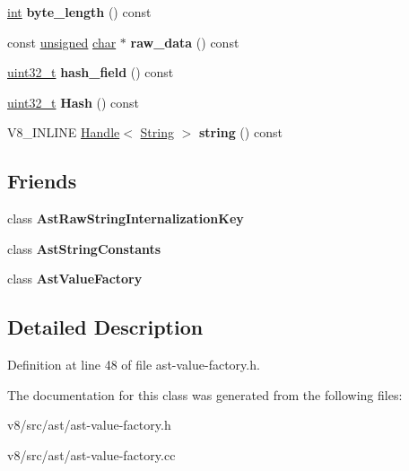 \begin{DoxyCompactItemize}
\mbox{\hyperlink{classint}{int}} {\bfseries byte\+\_\+length} () const
\item 
\mbox{\label{classv8_1_1internal_1_1AstRawString_adc9103906a1911c86ba6b142f3c63519}} 
const \mbox{\hyperlink{classunsigned}{unsigned}} \mbox{\hyperlink{classchar}{char}} $\ast$ {\bfseries raw\+\_\+data} () const
\item 
\mbox{\label{classv8_1_1internal_1_1AstRawString_ac0b0f9873611777173b87aedb5edae58}} 
\mbox{\hyperlink{classuint32__t}{uint32\+\_\+t}} {\bfseries hash\+\_\+field} () const
\item 
\mbox{\label{classv8_1_1internal_1_1AstRawString_ae76e07d9176c13bc786d35836d0de092}} 
\mbox{\hyperlink{classuint32__t}{uint32\+\_\+t}} {\bfseries Hash} () const
\item 
\mbox{\label{classv8_1_1internal_1_1AstRawString_a2effc0f0378490508e933c35b5d4d223}} 
V8\+\_\+\+I\+N\+L\+I\+NE \mbox{\hyperlink{classv8_1_1internal_1_1Handle}{Handle}}$<$ \mbox{\hyperlink{classv8_1_1internal_1_1String}{String}} $>$ {\bfseries string} () const
\end{DoxyCompactItemize}
\subsection*{Friends}
\begin{DoxyCompactItemize}
\item 
\mbox{\label{classv8_1_1internal_1_1AstRawString_aa99ea383a648693891f30539a9b5faad}} 
class {\bfseries Ast\+Raw\+String\+Internalization\+Key}
\item 
\mbox{\label{classv8_1_1internal_1_1AstRawString_a8cfaf63705e8c4363a805b0e4553b82e}} 
class {\bfseries Ast\+String\+Constants}
\item 
\mbox{\label{classv8_1_1internal_1_1AstRawString_a1d507e13f196677ce9bdd7b29efd96c0}} 
class {\bfseries Ast\+Value\+Factory}
\end{DoxyCompactItemize}


\subsection{Detailed Description}


Definition at line 48 of file ast-\/value-\/factory.\+h.



The documentation for this class was generated from the following files\+:\begin{DoxyCompactItemize}
\item 
v8/src/ast/ast-\/value-\/factory.\+h\item 
v8/src/ast/ast-\/value-\/factory.\+cc\end{DoxyCompactItemize}
